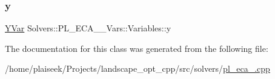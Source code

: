 \mbox{\label{class_solvers_1_1_p_l___e_c_a__2___vars_1_1_variables_ad91fe57de19d83708726d75373edc22a}} 
\subsubsection{\texorpdfstring{y}{y}}
{\footnotesize\ttfamily \hyperlink{class_solvers_1_1_p_l___e_c_a__2___vars_1_1_y_var}{Y\+Var} Solvers\+::\+P\+L\+\_\+\+E\+C\+A\+\_\+\_\+\+Vars\+::\+Variables\+::y}



The documentation for this class was generated from the following file\+:\begin{DoxyCompactItemize}
\item 
/home/plaiseek/\+Projects/landscape\+\_\+opt\+\_\+cpp/src/solvers/\hyperlink{pl__eca__2_8cpp}{pl\+\_\+eca\+\_.\+cpp}\end{DoxyCompactItemize}
